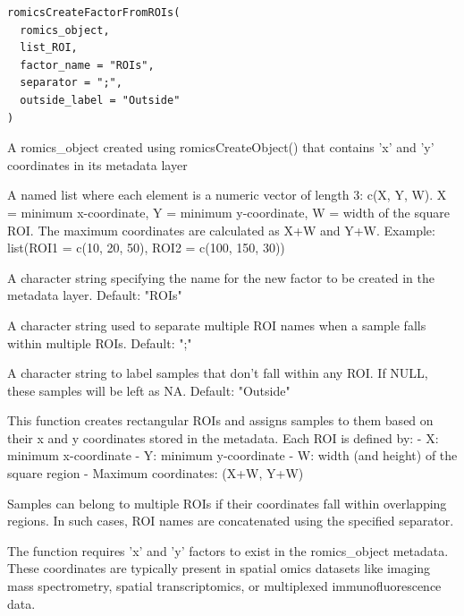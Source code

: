 \documentclass[a4paper]{book}
\begin{document}
%
\begin{Usage}
\begin{verbatim}
romicsCreateFactorFromROIs(
  romics_object,
  list_ROI,
  factor_name = "ROIs",
  separator = ";",
  outside_label = "Outside"
)
\end{verbatim}
\end{Usage}
%
\begin{Arguments}
\begin{ldescription}
\item[\code{romics\_object}] A romics\_object created using romicsCreateObject() that contains 'x' and 'y'
coordinates in its metadata layer

\item[\code{list\_ROI}] A named list where each element is a numeric vector of length 3: c(X, Y, W).
X = minimum x-coordinate, Y = minimum y-coordinate, W = width of the square ROI.
The maximum coordinates are calculated as X+W and Y+W.
Example: list(ROI1 = c(10, 20, 50), ROI2 = c(100, 150, 30))

\item[\code{factor\_name}] A character string specifying the name for the new factor to be created
in the metadata layer. Default: "ROIs"

\item[\code{separator}] A character string used to separate multiple ROI names when a sample
falls within multiple ROIs. Default: ";"

\item[\code{outside\_label}] A character string to label samples that don't fall within any ROI.
If NULL, these samples will be left as NA. Default: "Outside"
\end{ldescription}
\end{Arguments}
%
\begin{Details}
This function creates rectangular ROIs and assigns samples to them based on their
x and y coordinates stored in the metadata. Each ROI is defined by:
- X: minimum x-coordinate
- Y: minimum y-coordinate
- W: width (and height) of the square region
- Maximum coordinates: (X+W, Y+W)

Samples can belong to multiple ROIs if their coordinates fall within overlapping regions.
In such cases, ROI names are concatenated using the specified separator.

The function requires 'x' and 'y' factors to exist in the romics\_object metadata.
These coordinates are typically present in spatial omics datasets like imaging mass spectrometry,
spatial transcriptomics, or multiplexed immunofluorescence data.
\end{Details}
\end{document}
